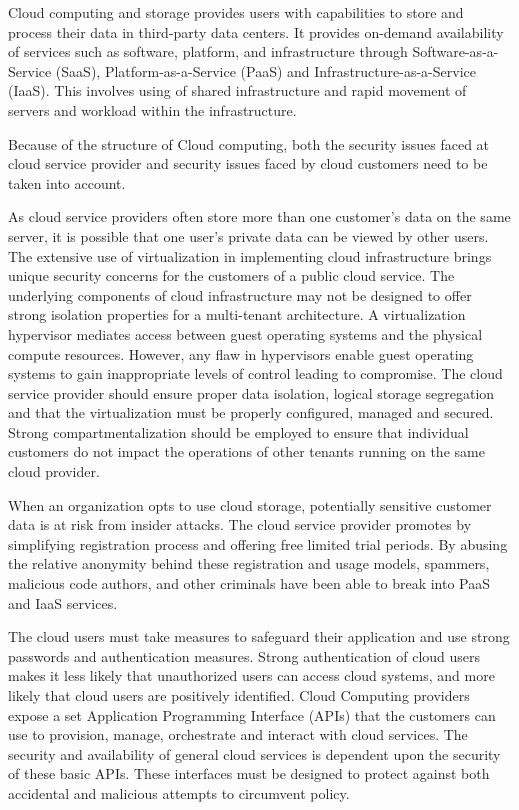 \begin{multicols}{2}
Cloud computing and storage provides users with capabilities to store and process their data in third-party data centers. It provides on-demand availability of services such as software, platform, and infrastructure through Software-as-a-Service (SaaS), Platform-as-a-Service (PaaS) and Infrastructure-as-a-Service (IaaS). This involves using of shared infrastructure and rapid movement of servers and workload within the infrastructure. 

Because of the structure of Cloud computing, both the security issues faced at cloud service provider and security issues faced by cloud customers need to be taken into account.

As cloud service providers often store more than one customer's data on the same server, it is possible that one user's private data can be viewed by other users. The extensive use of virtualization in implementing cloud infrastructure brings unique security concerns for the customers of a public cloud service. The underlying components of cloud infrastructure may not be designed to offer strong isolation properties for a multi-tenant architecture. A virtualization hypervisor mediates access between guest operating systems and the physical compute resources. However, any flaw in hypervisors enable guest operating systems to gain inappropriate levels of control leading to compromise. The cloud service provider should ensure proper data isolation, logical storage segregation and that the virtualization must be properly configured, managed and secured. Strong compartmentalization should be employed to ensure that individual customers do not impact the operations of other tenants running on the same cloud provider.

When an organization opts to use cloud storage, potentially sensitive customer data is at risk from insider attacks. The cloud service provider promotes by simplifying registration process and offering free limited trial periods. By abusing the relative anonymity behind these registration and usage models, spammers, malicious code authors, and other criminals have been able to break into PaaS and IaaS services. 

The cloud users must take measures to safeguard their application and use strong passwords and authentication measures. Strong authentication of cloud users makes it less likely that unauthorized users can access cloud systems, and more likely that cloud users are positively identified. Cloud Computing providers expose a set Application Programming Interface (APIs) that the customers can use to provision, manage, orchestrate and interact with cloud services. The security and availability of general cloud services is dependent upon the security of these basic APIs. These interfaces must be designed to protect against both accidental and malicious attempts to circumvent policy.


\end{multicols}
